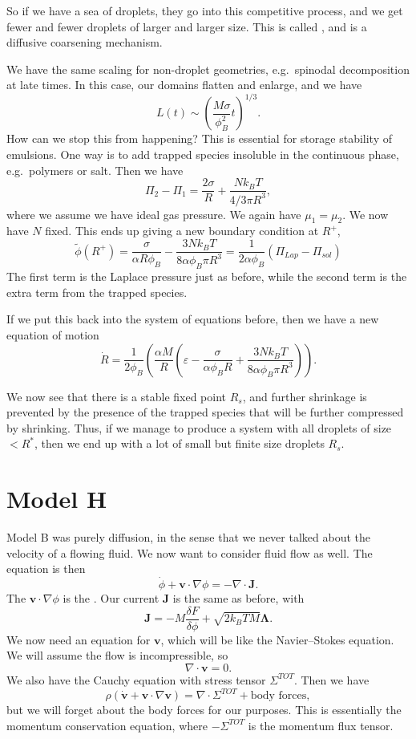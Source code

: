 \documentclass[a4paper]{article}
\begin{document}
So if we have a sea of droplets, they go into this competitive process, and we get fewer and fewer droplets of larger and larger size. This is called , and is a diffusive coarsening mechanism.

We have the same scaling for non-droplet geometries, e.g.\ spinodal decomposition at late times. In this case, our domains flatten and enlarge, and we have
\[
  L(t) \sim \left(\frac{M\sigma}{\phi_B^2} t\right)^{1/3}.
\]
How can we stop this from happening? This is essential for storage stability of emulsions. One way is to add trapped species insoluble in the continuous phase, e.g.\ polymers or salt. Then we have
\[
  \Pi_2 - \Pi_1 = \frac{2\sigma}{R} + \frac{Nk_B T}{4/3 \pi R^3},
\]
where we assume we have ideal gas pressure. We again have $\mu_1 = \mu_2$. We now have $N$ fixed. This ends up giving a new boundary condition at $R^+$,
\[
  \tilde{\phi}(R^+) = \frac{\sigma}{\alpha R \phi_B} - \frac{3N k_B T}{8 \alpha \phi_B \pi R^3} = \frac{1}{2 \alpha \phi_B} (\Pi_{Lap} - \Pi_{sol})
\]
The first term is the Laplace pressure just as before, while the second term is the extra term from the trapped species. 

If we put this back into the system of equations before, then we have a new equation of motion
\[
  \dot{R} = \frac{1}{2 \phi_B} \left( \frac{\alpha M}{R} \left(\varepsilon - \frac{\sigma}{\alpha \phi_B R} + \frac{3 N k_B T}{8 \alpha \phi_B \pi R^3}\right)\right).
\]

We now see that there is a stable fixed point $R_s$, and further shrinkage is prevented by the presence of the trapped species that will be further compressed by shrinking. Thus, if we manage to produce a system with all droplets of size $< R^*$, then we end up with a lot of small but finite size droplets $R_s$.

\section{Model H}
Model B was purely diffusion, in the sense that we never talked about the velocity of a flowing fluid. We now want to consider fluid flow as well. The equation is then
\[
  \dot{\phi} + \mathbf{v} \cdot \nabla \phi = - \nabla \cdot \mathbf{J}.
\]
The $\mathbf{v} \cdot \nabla \phi$ is the . Our current $\mathbf{J}$ is the same as before, with
\[
  \mathbf{J} = -M \frac{\delta F}{\delta \phi} + \sqrt{2k_B T M} \boldsymbol\Lambda.
\]
We now need an equation for $\mathbf{v}$, which will be like the Navier--Stokes equation. We will assume the flow is incompressible, so
\[
  \nabla \cdot \mathbf{v} = 0
.\]
We also have the Cauchy equation with stress tensor $\Sigma^{TOT}$. Then we have
\[
  \rho(\dot{\mathbf{v}} + \mathbf{v} \cdot \nabla \mathbf{v}) = \nabla \cdot \Sigma^{TOT} + \text{body forces},
\]
but we will forget about the body forces for our purposes. This is essentially the momentum conservation equation, where $- \Sigma^{TOT}$ is the momentum flux tensor.
\end{document}
